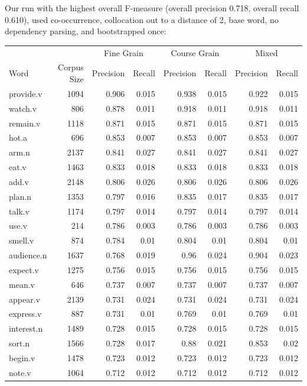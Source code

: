 \documentclass{article}
\begin{document}
Our run with the highest overall F-measure (overall precision 0.718, overall
recall 0.610), used co-occurrence, collocation out to a distance of 2, base word,
no dependency parsing, and bootstrapped once:

\begin{longtable}{l | r r r r r r r}
		&	&	\multicolumn{2}{c}{Fine Grain}	&	\multicolumn{2}{c}{Course Grain}	&	\multicolumn{2}{c}{Mixed}\\
Word	&	Corpus Size	&	Precision	&	Recall	&	Precision	&	Recall	&	Precision	&	Recall\\
\hline
provide.v	&	1094	&	0.906	&	0.015	&	0.938	&	0.015	&	0.922	&	0.015\\
watch.v	&	806	&	0.878	&	0.011	&	0.918	&	0.011	&	0.918	&	0.011\\
remain.v	&	1118	&	0.871	&	0.015	&	0.871	&	0.015	&	0.871	&	0.015\\
hot.a	&	696	&	0.853	&	0.007	&	0.853	&	0.007	&	0.853	&	0.007\\
arm.n	&	2137	&	0.841	&	0.027	&	0.841	&	0.027	&	0.841	&	0.027\\
eat.v	&	1463	&	0.833	&	0.018	&	0.833	&	0.018	&	0.833	&	0.018\\
add.v	&	2148	&	0.806	&	0.026	&	0.806	&	0.026	&	0.806	&	0.026\\
plan.n	&	1353	&	0.797	&	0.016	&	0.835	&	0.017	&	0.835	&	0.017\\
talk.v	&	1174	&	0.797	&	0.014	&	0.797	&	0.014	&	0.797	&	0.014\\
use.v	&	214	&	0.786	&	0.003	&	0.786	&	0.003	&	0.786	&	0.003\\
smell.v	&	874	&	0.784	&	0.01	&	0.804	&	0.01	&	0.804	&	0.01\\
audience.n	&	1637	&	0.768	&	0.019	&	0.96	&	0.024	&	0.904	&	0.023\\
expect.v	&	1275	&	0.756	&	0.015	&	0.756	&	0.015	&	0.756	&	0.015\\
mean.v	&	646	&	0.737	&	0.007	&	0.737	&	0.007	&	0.737	&	0.007\\
appear.v	&	2139	&	0.731	&	0.024	&	0.731	&	0.024	&	0.731	&	0.024\\
express.v	&	887	&	0.731	&	0.01	&	0.769	&	0.01	&	0.769	&	0.01\\
interest.n	&	1489	&	0.728	&	0.015	&	0.728	&	0.015	&	0.728	&	0.015\\
sort.n	&	1566	&	0.728	&	0.017	&	0.88	&	0.021	&	0.853	&	0.02\\
begin.v	&	1478	&	0.723	&	0.012	&	0.723	&	0.012	&	0.723	&	0.012\\
note.v	&	1064	&	0.712	&	0.012	&	0.712	&	0.012	&	0.712	&	0.012\\

\end{longtable}
\end{document}
